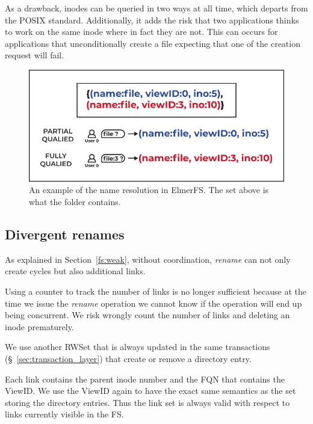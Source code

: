\documentclass[sigconf, anonymous, 10pt]{acmart}
\begin{document}
As a drawback, inodes can be queried in two ways at all time, which departs from the POSIX standard. Additionally, it adds the risk
that two applications thinks to work on the same inode where in fact they are not. This can occurs for applications that unconditionally create a file
expecting that one of the creation request will fail.

\begin{figure}[h]
	\caption{An example of the name resolution in ElmerFS. The set above is
	what the folder contains.}
	\label{fig:fqn}
	\centering
	\includegraphics[scale=0.6]{Le-bonhomme-sait-pas-ce-quil-veut.pdf}
\end{figure}


\subsection{Divergent renames}

As explained in Section~\ref{fs:weak}, without coordination, \textit{rename} can not only create
cycles but also additional links.

Using a counter to track the number of links is no longer sufficient because at the time we issue
the \textit{rename} operation we cannot know if the operation will end up being concurrent. We
risk wrongly count the number of links and deleting an inode prematurely.

We use another RWSet that is always updated in the same transactions (\S~\ref{sec:transaction_layer}) that create or remove
a directory entry.

Each link contains the parent inode number and the FQN that contains the ViewID.
We use the ViewID again to have the exact same semantics as the set storing
the directory entries. Thus the link set is always valid with respect to
links currently visible in the FS.
\end{document}
